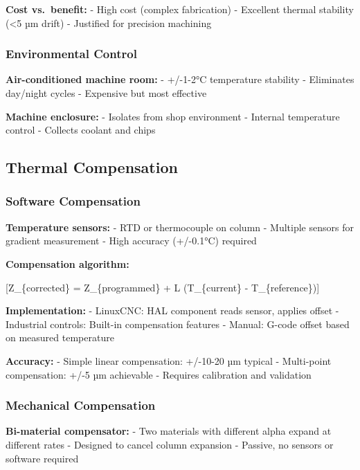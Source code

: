 \documentclass[
]{article}
\begin{document}
\textbf{Cost vs.~benefit:} - High cost (complex fabrication) - Excellent
thermal stability (\textless5 µm drift) - Justified for precision
machining

\subsubsection{Environmental Control}\label{environmental-control}

\textbf{Air-conditioned machine room:} - +/-1-2°C temperature stability
- Eliminates day/night cycles - Expensive but most effective

\textbf{Machine enclosure:} - Isolates from shop environment - Internal
temperature control - Collects coolant and chips

\subsection{Thermal Compensation}\label{thermal-compensation}

\subsubsection{Software Compensation}\label{software-compensation}

\textbf{Temperature sensors:} - RTD or thermocouple on column - Multiple
sensors for gradient measurement - High accuracy (+/-0.1°C) required

\textbf{Compensation algorithm:}

{[}Z\_\{corrected\} = Z\_\{programmed\} + \alpha \times L
\times (T\_\{current\} - T\_\{reference\}){]}

\textbf{Implementation:} - LinuxCNC: HAL component reads sensor, applies
offset - Industrial controls: Built-in compensation features - Manual:
G-code offset based on measured temperature

\textbf{Accuracy:} - Simple linear compensation: +/-10-20 µm typical -
Multi-point compensation: +/-5 µm achievable - Requires calibration and
validation

\subsubsection{Mechanical Compensation}\label{mechanical-compensation}

\textbf{Bi-material compensator:} - Two materials with different alpha
expand at different rates - Designed to cancel column expansion -
Passive, no sensors or software required
\end{document}

